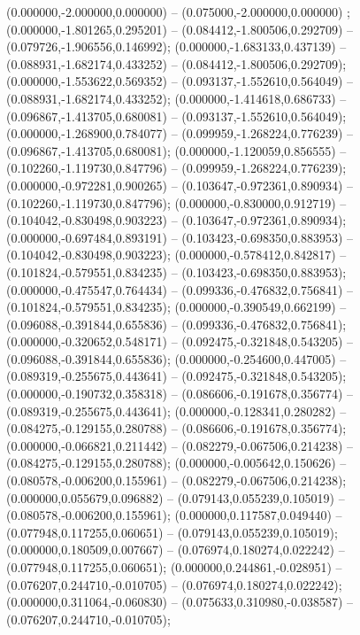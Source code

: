  (0.000000,-2.000000,0.000000) -- (0.075000,-2.000000,0.000000) ;
 (0.000000,-1.801265,0.295201) -- (0.084412,-1.800506,0.292709) -- (0.079726,-1.906556,0.146992);
 (0.000000,-1.683133,0.437139) -- (0.088931,-1.682174,0.433252) -- (0.084412,-1.800506,0.292709);
 (0.000000,-1.553622,0.569352) -- (0.093137,-1.552610,0.564049) -- (0.088931,-1.682174,0.433252);
 (0.000000,-1.414618,0.686733) -- (0.096867,-1.413705,0.680081) -- (0.093137,-1.552610,0.564049);
 (0.000000,-1.268900,0.784077) -- (0.099959,-1.268224,0.776239) -- (0.096867,-1.413705,0.680081);
 (0.000000,-1.120059,0.856555) -- (0.102260,-1.119730,0.847796) -- (0.099959,-1.268224,0.776239);
 (0.000000,-0.972281,0.900265) -- (0.103647,-0.972361,0.890934) -- (0.102260,-1.119730,0.847796);
 (0.000000,-0.830000,0.912719) -- (0.104042,-0.830498,0.903223) -- (0.103647,-0.972361,0.890934);
 (0.000000,-0.697484,0.893191) -- (0.103423,-0.698350,0.883953) -- (0.104042,-0.830498,0.903223);
 (0.000000,-0.578412,0.842817) -- (0.101824,-0.579551,0.834235) -- (0.103423,-0.698350,0.883953);
 (0.000000,-0.475547,0.764434) -- (0.099336,-0.476832,0.756841) -- (0.101824,-0.579551,0.834235);
 (0.000000,-0.390549,0.662199) -- (0.096088,-0.391844,0.655836) -- (0.099336,-0.476832,0.756841);
 (0.000000,-0.320652,0.548171) -- (0.092475,-0.321848,0.543205) -- (0.096088,-0.391844,0.655836);
 (0.000000,-0.254600,0.447005) -- (0.089319,-0.255675,0.443641) -- (0.092475,-0.321848,0.543205);
 (0.000000,-0.190732,0.358318) -- (0.086606,-0.191678,0.356774) -- (0.089319,-0.255675,0.443641);
 (0.000000,-0.128341,0.280282) -- (0.084275,-0.129155,0.280788) -- (0.086606,-0.191678,0.356774);
 (0.000000,-0.066821,0.211442) -- (0.082279,-0.067506,0.214238) -- (0.084275,-0.129155,0.280788);
 (0.000000,-0.005642,0.150626) -- (0.080578,-0.006200,0.155961) -- (0.082279,-0.067506,0.214238);
 (0.000000,0.055679,0.096882) -- (0.079143,0.055239,0.105019) -- (0.080578,-0.006200,0.155961);
 (0.000000,0.117587,0.049440) -- (0.077948,0.117255,0.060651) -- (0.079143,0.055239,0.105019);
 (0.000000,0.180509,0.007667) -- (0.076974,0.180274,0.022242) -- (0.077948,0.117255,0.060651);
 (0.000000,0.244861,-0.028951) -- (0.076207,0.244710,-0.010705) -- (0.076974,0.180274,0.022242);
 (0.000000,0.311064,-0.060830) -- (0.075633,0.310980,-0.038587) -- (0.076207,0.244710,-0.010705);
